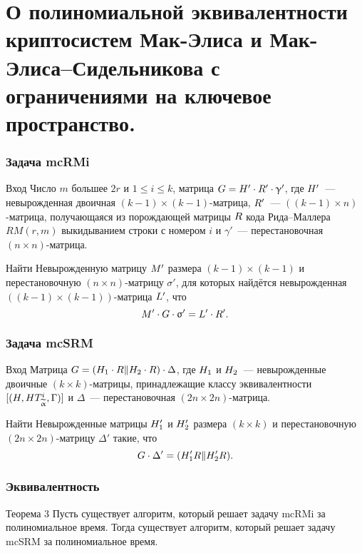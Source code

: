 
\section[Об эквивалентности]{О полиномиальной эквивалентности криптосистем Мак-Элиса и Мак-Элиса--Сидельникова с ограничениями на ключевое пространство.}

\begin{frame}
\frametitle{Задача mcRMi}
\begin{block}{Вход}
Число $m$ большее $2r$ и  $1\leqslant i\leqslant k$, матрица ${G}={H}'\cdot {R}'\cdot \upgamma'$, где ${H}'$~--- невырожденная двоичная $(k-1)\times (k-1)$-матрица, ${R}'$~--- $((k-1)\times n)$-матрица, получающаяся из порождающей матрицы ${R}$ кода Рида--Маллера $RM(r,m)$ выкидыванием строки с номером $i$ и $\gamma'$~--- перестановочная $(n\times n)$-матрица.
\end{block}
\begin{block}{Найти}
 Невырожденную матрицу ${M}'$ размера $(k-1)\times (k-1)$ и перестановочную $(n\times n)$-матрицу $\sigma'$, для которых  найдётся невырожденная $((k-1)\times (k-1))$-матрица ${L}'$, что  \[{M}'\cdot {G}\cdot \upsigma'={L}'\cdot {R}'.\]
\end{block}
\end{frame}


\begin{frame}
\frametitle{Задача mcSRM}
\begin{block}{Вход}
Матрица ${G}=({H}_1\cdot {R}\|{H}_2\cdot {R})\cdot \Delta$, где ${H}_1$ и ${H}_2$~--- невырожденные двоичные $(k\times k)$-матрицы, принадлежащие классу эквивалентности $[({H},{H}{T}^i_{\widetilde{\upalpha}},\Gamma)]$  и $\Delta$~--- перестановочная $(2n\times 2n)$-матрица.
\end{block}
\begin{block}{Найти}
Невырожденные матрицы ${H}'_1$ и ${H}'_2$ размера $(k\times k)$ и перестановочную $(2n\times 2n)$-матрицу $\Delta'$ такие, что \[{G}\cdot \Delta'=({H}'_1{R}\|{H}'_2{R}).\]
\end{block}
\end{frame}

\begin{frame}
\frametitle{Эквивалентность}
\begin{block}{Теорема 3}
Пусть существует алгоритм, который решает задачу mcRMi за полиномиальное время.
Тогда существует алгоритм, который решает задачу mcSRM за полиномиальное время.
\end{block}
\end{frame}

